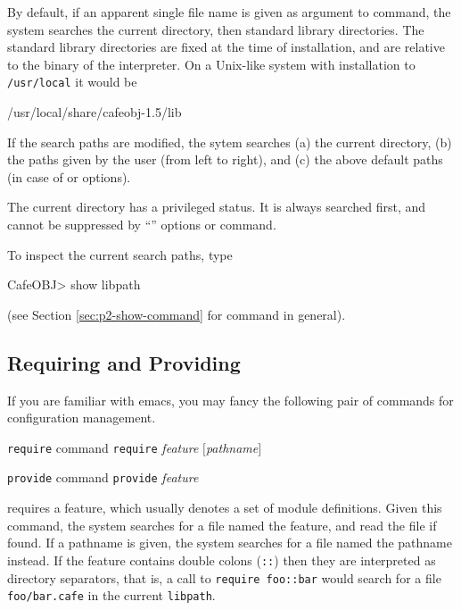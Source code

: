 \documentclass[a4paper]{memoir}
\begin{document}
By default, if an apparent single file name is given as argument to
 command, the system searches the current directory,
then standard library directories. The standard library directories
are fixed at the time of installation, and are relative to the binary
of the interpreter. On a Unix-like system with installation to
\verb|/usr/local| it would be
\begin{vvtm}
\begin{ccode}
  /usr/local/share/cafeobj-1.5/lib
\end{ccode}
\end{vvtm}
If the search paths are modified, the sytem searches (a) the current
directory, (b) the paths given by the user (from left to right), and
(c) the above default paths (in case of \kbd{+} or  options).

\begin{warning}
  The current directory has a privileged status. It is always searched
  first, and cannot be suppressed by ``'' options or 
  command.
\end{warning}

To inspect the current search paths, type
\begin{vvtm}
\begin{ccode}
  CafeOBJ> show libpath
\end{ccode}
\end{vvtm}
(see Section \ref{sec:p2-show-command} for  command in general).

\subsection{Requiring and Providing}

If you are familiar with emacs, you may fancy the
following pair of commands for configuration management.

\begin{bsyntax} \texttt{require} command \Hline
\texttt{require} \textit{feature} $[$\textit{pathname}$]$
\end{bsyntax}

\begin{bsyntax} \texttt{provide} command \Hline
\texttt{provide} \textit{feature}
\end{bsyntax}

 requires a feature, which usually
denotes a set of module definitions. Given this command, the
system searches for a file named the feature, and read the file
if found. If a pathname is given, the system searches for a file
named the pathname instead. If the feature contains double colons
(\verb|::|) then they are interpreted as directory separators, that
is, a call to \verb|require foo::bar| would search for a file
\verb|foo/bar.cafe| in the current \verb|libpath|.
\end{document}
